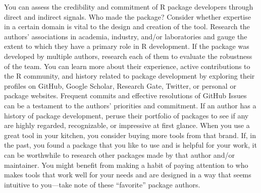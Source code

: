 \documentclass[10pt,letterpaper]{article}
\begin{document}
You can assess the credibility and commitment of R package developers
through direct and indirect signals. Who made the package? Consider
whether expertise in a certain domain is vital to the design and
creation of the tool. Research the authors' associations in academia,
industry, and/or laboratories and gauge the extent to which they have a
primary role in R development. If the package was developed by multiple
authors, research each of them to evaluate the robustness of the team.
You can learn more about their experience, active contributions to the R
community, and history related to package development by exploring their
profiles on GitHub, Google Scholar, Research Gate, Twitter, or personal
or package websites. Frequent commits and effective resolutions of
GitHub Issues can be a testament to the authors' priorities and
commitment. If an author has a history of package development, peruse
their portfolio of packages to see if any are highly regarded,
recognizable, or impressive at first glance. When you use a great tool
in your kitchen, you consider buying more tools from that brand. If, in
the past, you found a package that you like to use and is helpful for
your work, it can be worthwhile to research other packages made by that
author and/or maintainer. You might benefit from making a habit of
paying attention to who makes tools that work well for your needs and
are designed in a way that seems intuitive to you---take note of these
``favorite'' package authors.
\end{document}
